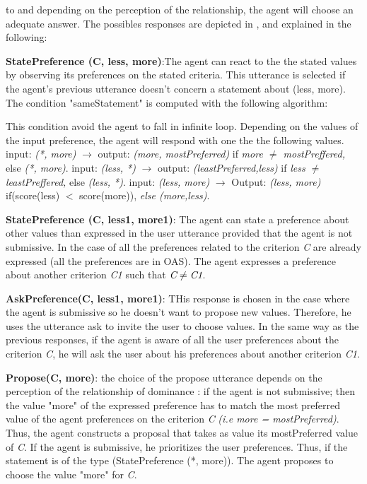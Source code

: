 \documentclass{llncs}
\begin{document}
	to and depending on the perception of the relationship, the agent will choose  an adequate answer. The possibles responses are depicted in , and explained in the following: 
	\begin{enumerate}
{ \color{red}		\item \textbf{StatePreference (C, less, more)}:The agent can react to the the stated values by observing its preferences on the stated criteria. This utterance is selected if the agent's previous utterance doesn't concern a statement about (less, more). 
		The condition "sameStatement" is computed with the following algorithm: 
		
		This condition avoid the agent to fall in infinite loop.  Depending on the values of the input preference, the agent will respond with one the the following values. 
			\subitem input: \textit{(*, more)} $\rightarrow$ 
				output: \textit{(more, mostPreferred)} if \textit{more $\not = $ mostPreffered,} else \textit{(*, more)}.
			\subitem input: \textit{(less, *)} $\rightarrow$ 
				output: \textit{(leastPreferred,less)} if \textit{less $\not = $ leastPreffered,} else \textit{(less, *)}.
			\subitem input: \textit{(less, more)} $\rightarrow$ Output:  \textit{(less, more)} if(score(less) $<$ score(more)), \textit{else (more,less)}.
	}	
		\item \textbf{StatePreference (C, less1, more1)}: The agent can state a preference about other values than expressed in the user utterance provided that the agent is not submissive. In the case of all the preferences related to the criterion \emph{C} are already expressed (all the preferences are in OAS). The agent expresses a preference about another criterion \emph{C1} such that $\emph{C} \not = \emph{C1}$.
		
		\item \textbf{AskPreference(C, less1, more1)}: THis response is chosen in the case where the agent is submissive so he doesn't want to propose new values. Therefore, he uses the utterance ask to invite the user to choose values. In the same way as the previous responses, if the agent is aware of all the user preferences about the criterion \emph{C}, he will ask the user about his preferences about another criterion \emph{C1}.
		
		
		\item  \textbf{Propose(C, more)}: the choice of the propose utterance depends on the perception of the relationship of dominance : 
			\subitem if the agent is not submissive; then  the value "more" of the expressed preference has to match the most preferred value of the agent preferences on the criterion \emph{C} \textit{(i.e more = mostPreferred)}. Thus, the agent constructs a proposal that takes as value its mostPreferred value of  \emph{C}.
			\subitem If the agent is submissive, he prioritizes the user preferences. Thus, if the statement is of the type (StatePreference (*, more)). The agent proposes to choose the value "more" for \emph{C}.
	\end{enumerate}
\end{document}
